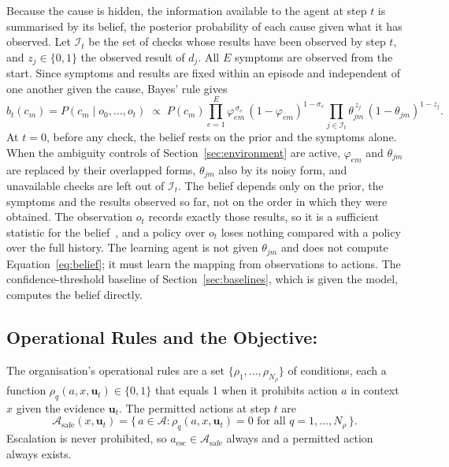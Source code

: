 Because the cause is hidden, the information available to the agent at step $t$ is summarised by its belief, the posterior probability of each cause given what it has observed. Let $\mathcal{I}_t$ be the set of checks whose results have been observed by step $t$, and $z_j \in \{0, 1\}$ the observed result of $d_j$. All $E$ symptoms are observed from the start. Since symptoms and results are fixed within an episode and independent of one another given the cause, Bayes' rule gives
\begin{equation}
b_t(c_m) = P(c_m \mid o_0, \dots, o_t) \;\propto\; P(c_m) \prod_{e=1}^{E} \varphi_{em}^{\,\sigma_e} \, (1 - \varphi_{em})^{1 - \sigma_e} \prod_{j \in \mathcal{I}_t} \theta_{jm}^{\,z_j} \, (1 - \theta_{jm})^{1 - z_j}.
\label{eq:belief}
\end{equation}
At $t = 0$, before any check, the belief rests on the prior and the symptoms alone. When the ambiguity controls of Section~\ref{sec:environment} are active, $\varphi_{em}$ and $\theta_{jm}$ are replaced by their overlapped forms, $\theta_{jm}$ also by its noisy form, and unavailable checks are left out of $\mathcal{I}_t$. The belief depends only on the prior, the symptoms and the results observed so far, not on the order in which they were obtained. The observation $o_t$ records exactly those results, so it is a sufficient statistic for the belief~\cite{kaelbling1998}, and a policy over $o_t$ loses nothing compared with a policy over the full history. The learning agent is not given $\theta_{jm}$ and does not compute Equation~\eqref{eq:belief}; it must learn the mapping from observations to actions. The confidence-threshold baseline of Section~\ref{sec:baselines}, which is given the model, computes the belief directly.

\subsection{Operational Rules and the Objective:}

The organisation's operational rules are a set $\{\rho_1, \dots, \rho_{N_\rho}\}$ of conditions, each a function $\rho_q(a, x, \mathbf{u}_t) \in \{0, 1\}$ that equals 1 when it prohibits action $a$ in context $x$ given the evidence $\mathbf{u}_t$. The permitted actions at step $t$ are
\begin{equation}
\mathcal{A}_{\text{safe}}(x, \mathbf{u}_t) = \{\, a \in \mathcal{A} : \rho_q(a, x, \mathbf{u}_t) = 0 \text{ for all } q = 1, \dots, N_\rho \,\}.
\label{eq:safeset}
\end{equation}
Escalation is never prohibited, so $a_{\text{esc}} \in \mathcal{A}_{\text{safe}}$ always and a permitted action always exists.

